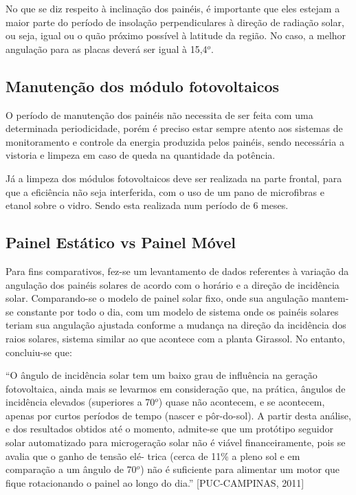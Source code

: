 	No que se diz respeito à inclinação dos painéis, é importante que eles estejam a maior parte do período de insolação perpendiculares à direção de radiação solar, ou seja, igual ou o quão próximo possível à latitude da região. No caso, a melhor angulação para as placas deverá ser igual à 15,4$^o$.

\subsection{Manutenção dos módulo fotovoltaicos}

	O período de manutenção dos painéis não necessita de ser feita com uma determinada periodicidade, porém é preciso estar sempre atento aos sistemas de monitoramento e controle da energia produzida pelos painéis, sendo necessária a vistoria e limpeza em caso de queda na quantidade da potência.

	Já a limpeza dos módulos fotovoltaicos deve ser realizada na parte frontal, para que a eficiência não seja interferida, com o uso de um pano de microfibras e etanol sobre o vidro. Sendo esta realizada num período de 6 meses. 

\subsection{Painel Estático vs Painel Móvel}

	Para fins comparativos, fez-se um levantamento de dados referentes à variação da angulação dos painéis solares de acordo com o horário e a direção de incidência solar. Comparando-se o modelo de painel solar fixo, onde sua angulação mantem-se constante por todo o dia, com um modelo de sistema onde os painéis solares teriam sua angulação ajustada conforme a mudança na direção da incidência dos raios solares, sistema similar ao que acontece com a planta Girassol. No entanto, concluiu-se que: 

	“O ângulo de incidência solar tem um baixo grau de influência na geração fotovoltaica, ainda mais se levarmos em consideração que, na prática, ângulos de incidência elevados (superiores a 70$^o$) quase não acontecem, e se acontecem, apenas por curtos períodos de tempo (nascer e pôr-do-sol). A partir desta análise, e dos resultados obtidos até o momento, admite-se que um protótipo seguidor solar automatizado para microgeração solar não é viável financeiramente, pois se avalia que o ganho de tensão elé- trica (cerca de 11\% a pleno sol e em comparação a um ângulo de 70$^o$) não é suficiente para alimentar um motor que fique rotacionando o painel ao longo do dia.” [PUC-CAMPINAS, 2011]

